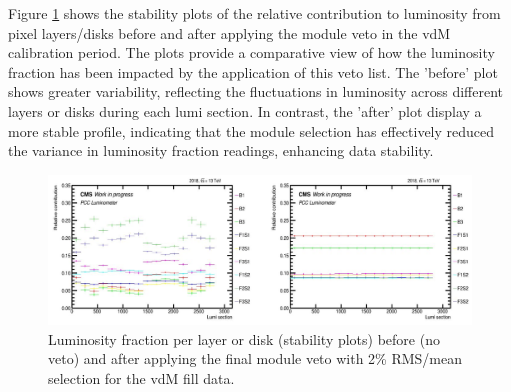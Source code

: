 Figure \ref{fig:b_a_stability_vdm} shows the stability plots of the relative contribution to luminosity from pixel layers/disks before and after applying the module veto in the vdM calibration period. %
The plots provide a comparative view of how the luminosity fraction has been impacted by the application of this veto list. The 'before' plot shows greater variability, reflecting the fluctuations in luminosity across different layers or disks  during each lumi section. In contrast, the 'after' plot  display a more stable profile, indicating that the module selection has effectively reduced the variance in luminosity fraction readings, enhancing data stability. %

\begin{figure}[!htp]
\centering
\includegraphics[width=1\textwidth]{ashish_thesis/before_after_vdm_stability_1.png}
\caption[PCC vdM Stability]{%
   Luminosity fraction per layer or disk (stability plots) before (no veto) and after applying the final module veto with 2\% RMS/mean selection for the vdM fill data.
}
\label{fig:b_a_stability_vdm}
\end{figure}


